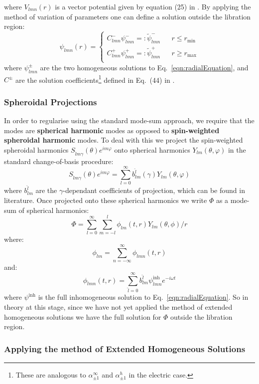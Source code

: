 \documentclass[preprint,showpacs,preprintnumbers,amssymb,superscriptaddress,aps,prd,nofootinbib,11pt]{revtex4-1}
\begin{document}
 where $V_{lmn}(r)$ is a vector potential given by equation (25) in \cite{Warburton_2011}. By applying the method of variation of parameters one can define a solution outside the libration region:
 \begin{equation}
     \psi_{lmn} (r) =  \left\{ \begin{aligned}
         C^-_{lmn} \psi^-_{lmn} =: \tilde{\psi}^-_{lmn} && r\leq r_\text{min}\\
         C^+_{lmn} \psi^+_{lmn} =: \tilde{\psi}^+_{lmn} && r\geq r_\text{max}\\
     \end{aligned}\right.
 \end{equation}
 where $\psi^\pm_{lmn}$ are the two homogeneous solutions to Eq.~\eqref{eqn:radialEquation}, and $C^\pm$ are the solution coefficients\footnote{These are analogous to $\alpha^\infty_{\pm1}$ and $\alpha^h_{\pm1}$ in the electric case.} defined in Eq.~(44) in \cite{Warburton_2011}.
\subsubsection{Spheroidal Projections}
In order to regularise using the standard mode-sum approach, we require that the modes are \textbf{spherical harmonic} modes as opposed to \textbf{spin-weighted spheroidal harmonic} modes. To deal with this we project the spin-weighted spheroidal harmonics $S_{\hat{l}m\gamma}(\theta)e^{im\varphi}$ onto spherical harmonics $Y_{lm}(\theta, \varphi)$ in the standard change-of-basis procedure:
\begin{equation}
    S_{\hat{l}m\gamma}(\theta) e^{im\varphi} = \sum\limits_{l=0}^\infty b^{\hat{l}}_{lm}(\gamma) Y_{lm}(\theta,\varphi)
\end{equation}
where $b^{\hat{l}}_{lm}$ are the $\gamma$-dependant coefficients of projection, which can be found in literature. Once projected onto these spherical harmonics we write $\Phi$ as a mode-sum of spherical harmonics:
\begin{equation}
    \Phi = \sum\limits_{l=0}^\infty \sum\limits_{m=-l}^l \phi_{lm}(t,r) Y_{lm}(\theta,\phi)/r
\end{equation}
where:
\begin{equation}
    \phi_{lm} = \sum\limits_{n=-\infty}^\infty \phi_{lmn}(t,r) 
\end{equation}
and:
\begin{equation}
    \phi_{lmn}(t,r) = \sum_{\hat{l} =0}^\infty b^{\hat{l}}_{lm} \psi^\text{inh}_{\hat{l}mn} e^{-i\omega t}
\end{equation}
where $\psi^\text{inh}$ is the full inhomogeneous solution to Eq.~\eqref{eqn:radialEquation}. So in theory at this stage, since we have not yet applied the method of extended homogeneous solutions we have the full solution for $\Phi$ outside the libration region. 
 \subsubsection{Applying the method of Extended Homogeneous Solutions}
 



\end{document}
